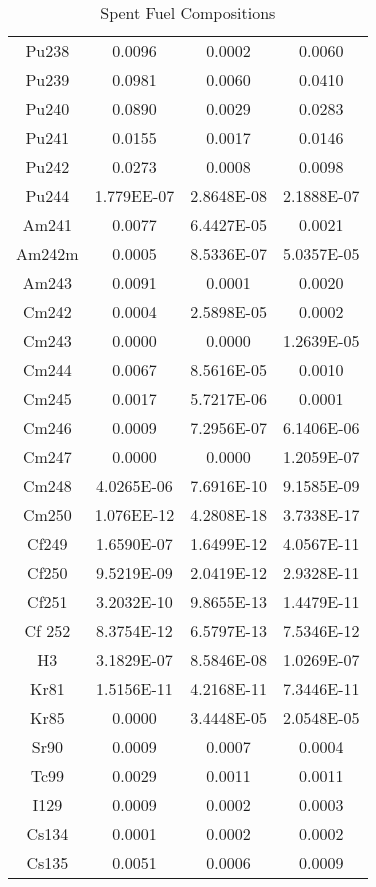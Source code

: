 \begin{table}[h!]
{\begin{tabular}{cccc}
Pu238    &      0.0096&         0.0002 &        0.0060 \\
Pu239    &      0.0981&         0.0060 &        0.0410 \\
Pu240    &      0.0890&         0.0029 &        0.0283 \\
Pu241    &      0.0155&         0.0017 &        0.0146 \\
Pu242    &      0.0273&         0.0008 &        0.0098 \\
Pu244    &      1.779EE-07&     2.8648E-08 &    2.1888E-07 \\
Am241    &      0.0077&         6.4427E-05 &    0.0021 \\
Am242m   &      0.0005&         8.5336E-07 &    5.0357E-05 \\
Am243    &      0.0091&         0.0001 &        0.0020 \\
Cm242    &      0.0004&         2.5898E-05 &    0.0002 \\
Cm243    &      0.0000&         0.0000 &        1.2639E-05 \\
Cm244    &      0.0067&         8.5616E-05 &    0.0010 \\
Cm245    &      0.0017&         5.7217E-06 &    0.0001 \\
Cm246    &      0.0009&         7.2956E-07 &    6.1406E-06 \\
Cm247    &      0.0000&         0.0000 &        1.2059E-07 \\
Cm248    &      4.0265E-06&     7.6916E-10 &    9.1585E-09 \\
Cm250    &      1.076EE-12&     4.2808E-18 &    3.7338E-17 \\
Cf249    &      1.6590E-07&     1.6499E-12 &    4.0567E-11 \\
Cf250    &      9.5219E-09&     2.0419E-12 &    2.9328E-11 \\
Cf251    &      3.2032E-10&     9.8655E-13 &    1.4479E-11 \\
Cf 252   &      8.3754E-12&     6.5797E-13 &    7.5346E-12 \\
H3       &      3.1829E-07&     8.5846E-08 &    1.0269E-07 \\
Kr81     &      1.5156E-11&     4.2168E-11 &    7.3446E-11 \\
Kr85     &      0.0000&         3.4448E-05 &    2.0548E-05 \\
Sr90     &      0.0009&         0.0007 &        0.0004 \\
Tc99     &      0.0029&         0.0011 &        0.0011 \\
I129     &      0.0009&         0.0002 &        0.0003 \\
Cs134    &      0.0001&         0.0002 &        0.0002 \\
Cs135    &      0.0051&         0.0006 &        0.0009
                \end{tabular}}
                \caption{Spent Fuel Compositions}
                \label{tab:comp}
\end{table}
